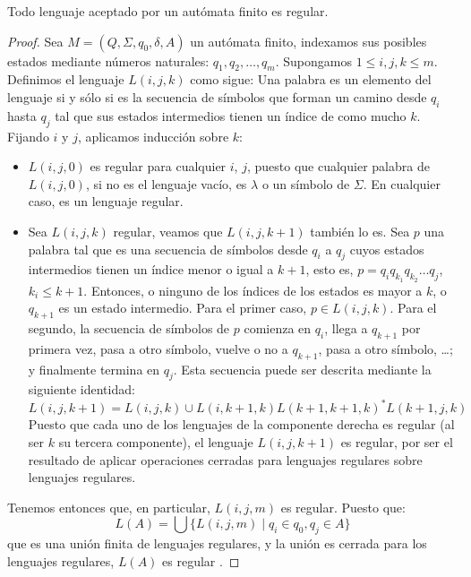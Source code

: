 \begin{lema}Todo lenguaje aceptado por un autómata finito es regular.
\end{lema}
\begin{proof}
Sea $M=(Q,\Sigma,q_0,\delta,A)$ un autómata finito, indexamos sus posibles estados mediante números naturales: 
$q_1,q_2,\dots,q_m$. Supongamos $1\leq i,j,k\leq m$. Definimos el lenguaje $L(i,j,k)$ como sigue: Una palabra es un 
elemento del lenguaje si y sólo si es la secuencia de símbolos que forman un camino desde $q_i$ hasta $q_j$ tal que sus 
estados intermedios tienen un índice de como mucho $k$. Fijando $i$ y $j$, aplicamos inducción sobre $k$:
\begin{itemize}
    \item $L(i,j,0)$ es regular para cualquier $i$, $j$, puesto que cualquier palabra de $L(i,j,0)$, si no es el
    lenguaje vacío, es $\lambda$ o un símbolo de $\Sigma$. En cualquier caso, es un lenguaje regular.
    \item Sea $L(i,j,k)$ regular, veamos que $L(i,j,k+1)$ también lo es. Sea $p$ una palabra tal que es una secuencia
    de símbolos desde $q_i$ a $q_j$ cuyos estados intermedios tienen un índice menor o igual a $k+1$, esto es,
    $p=q_iq_{k_1}q_{k_2}\dots q_j$, $k_i\leq k+1$. Entonces, o ninguno de los índices de los estados es mayor a $k$, o
    $q_{k+1}$ es un estado intermedio. Para el primer caso, $p\in L(i,j,k)$. Para el segundo, la secuencia de símbolos
    de $p$ comienza en $q_i$, llega a $q_{k+1}$ por primera vez, pasa a otro símbolo, vuelve o no a $q_{k+1}$, pasa a
    otro símbolo, \dots; y finalmente termina en $q_j$. Esta secuencia puede ser descrita mediante la siguiente
    identidad:
    \begin{equation}
        L(i,j,k+1)=L(i,j,k)\cup L(i,k+1,k)L(k+1,k+1,k)^*L(k+1,j,k)
    \end{equation}
    Puesto que cada uno de los lenguajes de la componente derecha es regular (al ser $k$ su tercera componente), el
    lenguaje $L(i,j,k+1)$ es regular, por ser el resultado de aplicar operaciones cerradas para lenguajes regulares
    sobre lenguajes regulares.
\end{itemize}
Tenemos entonces que, en particular, $L(i,j,m)$ es regular. Puesto que:
\begin{equation}
    L(A)=\bigcup\{L(i,j,m)\mid q_i\in q_0,q_j\in A\}
\end{equation}
que es una unión finita de lenguajes regulares, y la unión es cerrada para los lenguajes regulares, $L(A)$ es regular
\cite{kleene_teo}.
\end{proof}

